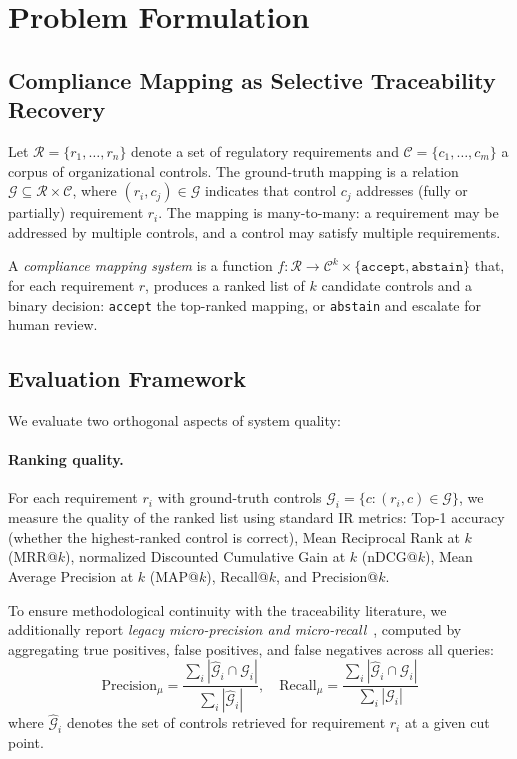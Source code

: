 \documentclass{sn-jnl}
\begin{document}
\section{Problem Formulation}
\label{sec:formulation}

\subsection{Compliance Mapping as Selective Traceability Recovery}

Let $\mathcal{R} = \{r_1, \ldots, r_n\}$ denote a set of regulatory requirements and $\mathcal{C} = \{c_1, \ldots, c_m\}$ a corpus of organizational controls.
The ground-truth mapping is a relation $\mathcal{G} \subseteq \mathcal{R} \times \mathcal{C}$, where $(r_i, c_j) \in \mathcal{G}$ indicates that control $c_j$ addresses (fully or partially) requirement $r_i$.
The mapping is many-to-many: a requirement may be addressed by multiple controls, and a control may satisfy multiple requirements.

A \emph{compliance mapping system} is a function $f: \mathcal{R} \rightarrow \mathcal{C}^k \times \{\texttt{accept}, \texttt{abstain}\}$ that, for each requirement $r$, produces a ranked list of $k$ candidate controls and a binary decision: \texttt{accept} the top-ranked mapping, or \texttt{abstain} and escalate for human review.

\subsection{Evaluation Framework}
\label{sec:metrics}

We evaluate two orthogonal aspects of system quality:

\paragraph{Ranking quality.}
For each requirement $r_i$ with ground-truth controls $\mathcal{G}_i = \{c : (r_i, c) \in \mathcal{G}\}$, we measure the quality of the ranked list using standard IR metrics: Top-1 accuracy (whether the highest-ranked control is correct), Mean Reciprocal Rank at $k$ (MRR@$k$), normalized Discounted Cumulative Gain at $k$ (nDCG@$k$), Mean Average Precision at $k$ (MAP@$k$), Recall@$k$, and Precision@$k$.

To ensure methodological continuity with the traceability literature, we additionally report \emph{legacy micro-precision and micro-recall}~\cite{MarcusMaletic2003}, computed by aggregating true positives, false positives, and false negatives across all queries:
\begin{equation}
\text{Precision}_\mu = \frac{\sum_i |\hat{\mathcal{G}}_i \cap \mathcal{G}_i|}{\sum_i |\hat{\mathcal{G}}_i|}, \quad
\text{Recall}_\mu = \frac{\sum_i |\hat{\mathcal{G}}_i \cap \mathcal{G}_i|}{\sum_i |\mathcal{G}_i|}
\end{equation}
where $\hat{\mathcal{G}}_i$ denotes the set of controls retrieved for requirement $r_i$ at a given cut point.
\end{document}
